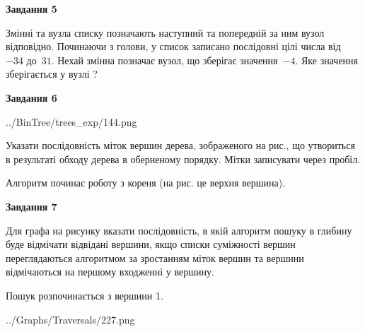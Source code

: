 \documentclass[12pt, ukrainian]{article}
\begin{document}
{\begin {large}
{\begin {center}\textbf{Завдання 5}\end {center}}\par
Змінні  та  вузла списку позначають наступний та попередній за ним вузол відповідно. Починаючи з голови, у список записано послідовні цілі числа від~$-34$ до~$31$. Нехай змінна  позначає вузол, що зберігає значення~$-4$.
Яке значення зберігається у вузлі  ?\par
\newpage

{\begin {center}\textbf{Завдання 6}\end {center}}\par

\begin{center}
	{../BinTree/trees_exp/144.png}
\end{center}
Указати послідовність міток вершин дерева, зображеного на рис., що утвориться в результаті обходу дерева в оберненому порядку. Мітки записувати через пробіл.\par Алгоритм починає роботу з кореня (на рис. це верхня вершина).\par
\newpage

{\begin {center}\textbf{Завдання 7}\end {center}}\par
Для графа на рисунку вказати послідовність, в якій алгоритм пошуку в глибину буде відмічати відвідані вершини, якщо списки суміжності вершин переглядаються алгоритмом за зростанням міток вершин та вершини відмічаються на першому вход\-женні у вершину.\par
Пошук розпочинається з вершини 1.\par

\begin{center}
	{../Graphs/Traversals/227.png}
\end{center}\par
\newpage


\end{large}}
\end{document}
